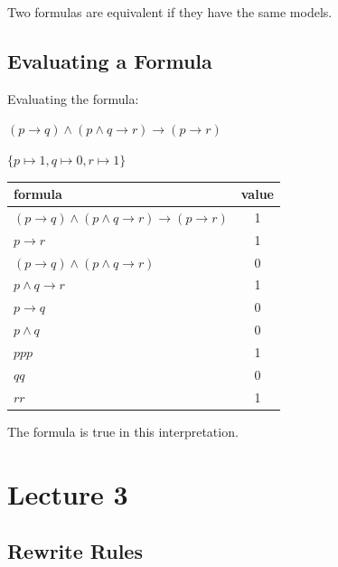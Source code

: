 \documentclass[11pt,a4paper]{article}
\begin{document}
Two formulas are equivalent if they have the same models.

\subsection{Evaluating a Formula}

Evaluating the formula:

$(p \rightarrow q) \wedge (p \wedge q \rightarrow r) \rightarrow (p \rightarrow r)$

$\{ p \mapsto 1, q \mapsto 0, r \mapsto 1 \}$
\vspace{5pt}

\begin{tabular}{l | c}
formula & value \\
\hline
$(p \rightarrow q) \wedge (p \wedge q \rightarrow r) \rightarrow (p \rightarrow r)$ & 1 \\
\hphantom{$(p \rightarrow q) \wedge (p \wedge q \rightarrow r) \rightarrow ($}$p \rightarrow r$ & 1 \\
$(p \rightarrow q) \wedge (p \wedge q \rightarrow r)$ & 0 \\
\hphantom{$(p \rightarrow q) \wedge ($}$p \wedge q \rightarrow r$ & 1 \\
\hphantom{$($}$p \rightarrow q$ & 0 \\
\hphantom{$(p \rightarrow q) \wedge ($}$p \wedge q$ & 0 \\
\hline
\hphantom{$($}$p$\hphantom{$ \rightarrow q) \wedge ($}\hspace{2pt}$p$\hphantom{$ \wedge q \rightarrow r) \rightarrow ($}\hspace{5pt}$p$ & 1 \\
\hphantom{$(p \rightarrow $}$q$\hphantom{$) \wedge (p \wedge $}\hspace{8pt}$q$ & 0 \\
\hphantom{$(p \rightarrow q) \wedge (p \wedge q \rightarrow $}$r$\hphantom{$) \rightarrow (p \rightarrow $}\hspace{8pt}$r$ & 1
\end{tabular}
\vspace{5pt}

The formula is true in this interpretation.

\newpage
\section{Lecture 3}
\subsection{Rewrite Rules}
\end{document}
